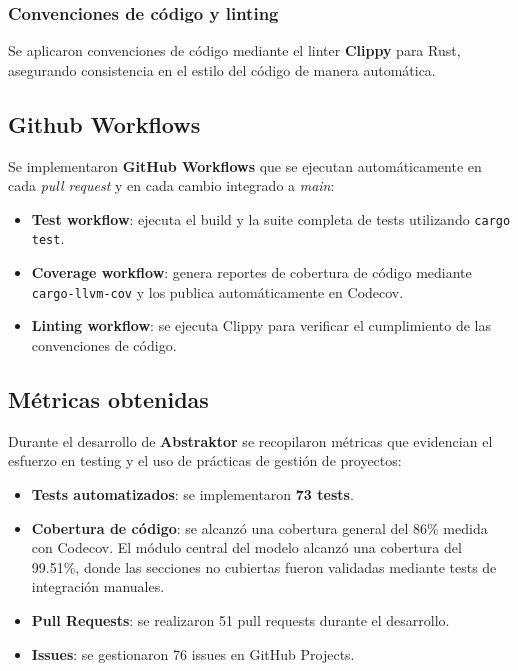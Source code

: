 \documentclass[12pt]{article}
\begin{document}
\subsubsection{Convenciones de código y linting}

Se aplicaron convenciones de código mediante el linter \textbf{Clippy} para Rust, asegurando consistencia en el estilo del código de manera automática.

\subsection{Github Workflows}

Se implementaron \textbf{GitHub Workflows} que se ejecutan automáticamente en cada \textit{pull request} y en cada cambio integrado a \textit{main}:

\begin{itemize}
    \item \textbf{Test workflow}: ejecuta el build y la suite completa de tests utilizando \texttt{cargo test}.
    \item \textbf{Coverage workflow}: genera reportes de cobertura de código mediante \texttt{cargo-llvm-cov} y los publica automáticamente en Codecov.
    \item \textbf{Linting workflow}: se ejecuta Clippy para verificar el cumplimiento de las convenciones de código.
\end{itemize}

\subsection{Métricas obtenidas}

Durante el desarrollo de \textbf{Abstraktor} se recopilaron métricas que evidencian el esfuerzo en testing y el uso de prácticas de gestión de proyectos:

\begin{itemize}
    \item \textbf{Tests automatizados}: se implementaron \textbf{73 tests}.
    
    \item \textbf{Cobertura de código}: se alcanzó una cobertura general del 86\% medida con Codecov. El módulo central del modelo alcanzó una cobertura del 99.51\%, donde las secciones no cubiertas fueron validadas mediante tests de integración manuales.
    
    \item \textbf{Pull Requests}: se realizaron 51 pull requests durante el desarrollo.
    
    \item \textbf{Issues}: se gestionaron 76 issues en GitHub Projects.
\end{itemize}
\end{document}
